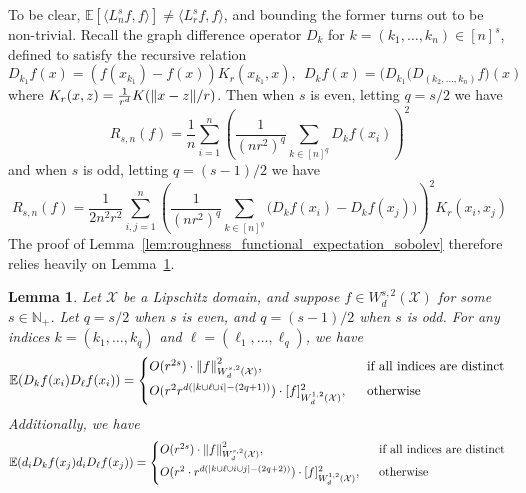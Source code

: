 \documentclass{article}
\newcommand{\1}{\mathbf{1}}
\newcommand{\Xset}{\mathcal{X}}
\newcommand{\Ebb}{\mathbb{E}}
\newcommand{\dotp}[2]{\langle #1, #2 \rangle}
\theoremstyle{alden}
\theoremstyle{aldenthm}
\newtheorem{lemma}{Lemma}
\theoremstyle{definition}
\theoremstyle{remark}
\begin{document}
To be clear, $\Ebb[\dotp{L_n^sf}{f}] \neq \dotp{L_r^sf}{f}$, and bounding the former turns out to be non-trivial. Recall the graph difference operator $D_k$ for $k = (k_1,\ldots,k_n) \in [n]^s$, defined to satisfy the recursive relation
\begin{equation*}
D_{k_1}f(x) = (f(x_{k_1}) - f(x))K_r(x_{k_1},x),~~ D_kf(x) = \bigl(D_{k_1}(D_{(k_2,\ldots,k_n)}f\bigr)(x)
\end{equation*}
where $K_r(x,z) = \frac{1}{r^d}K(\norm{x - z}/r)$. 
Then when $s$ is even, letting $q = s/2$ we have
\begin{equation}
\label{eqn:roughness_functional_representation_even}
R_{s,n}(f) = \frac{1}{n}\sum_{i = 1}^{n} \left(\frac{1}{(nr^2)^q}\sum_{k \in [n]^q} D_kf(x_i)\right)^2
\end{equation}
and when $s$ is odd, letting $q = (s - 1)/2$ we have
\begin{equation}
\label{eqn:roughness_functional_representation_odd}
R_{s,n}(f) =  \frac{1}{2n^2r^2}\sum_{i,j = 1}^{n}\left(\frac{1}{(nr^2)^q}\sum_{k \in [n]^q}\bigl(D_kf(x_i) - D_kf(x_j)\bigr)\right)^2K_r(x_i,x_j)
\end{equation} The proof of Lemma~\ref{lem:roughness_functional_expectation_sobolev} therefore relies heavily on Lemma~\ref{lem:expected_difference_operators_sobolev}.

\begin{lemma}
	\label{lem:expected_difference_operators_sobolev}
	Let $\Xset$ be a Lipschitz domain, and suppose $f \in W_d^{s,2}(\Xset)$ for some $s \in \mathbb{N}_{+}$. Let $q = s/2$ when $s$ is even, and $q = (s - 1)/2$ when $s$ is odd. For any indices $k = (k_1,\ldots,k_q)$ and $\ell = (\ell_1,\ldots,\ell_q)$, we have
	\begin{equation}
	\label{eqn:expected_difference_operators_sobolev_1}
	\Ebb(D_kf(x_i) D_\ell f(x_i)) =
	\begin{cases*}
	O(r^{2s}) \cdot \norm{f}_{W_d^{s,2}(\Xset)}^2, & ~~\textrm{if all indices are distinct} \\
	O(r^{2} r^{d(\abs{k \cup \ell \cup i} - (2q + 1))})\cdot [f]_{W_d^{1,2}(\Xset)}^2, & ~~\textrm{otherwise}~ 
	\end{cases*}
	\end{equation}
	Additionally, we have
	\begin{equation}
	\label{eqn:expected_difference_operators_sobolev_2}
	\Ebb(d_iD_kf(x_j) d_iD_\ell f(x_j)) =
	\begin{cases*}
	O(r^{2s}) \cdot \norm{f}_{W_d^{s,2}(\Xset)}^2, & ~~\textrm{if all indices are distinct} \\
	O(r^{2} \cdot r^{d(\abs{k \cup \ell \cup i \cup j} - (2q + 2))}) \cdot [f]_{W_d^{1,2}(\Xset)}^2, & ~~\textrm{otherwise}~ 
	\end{cases*}
	\end{equation}
\end{lemma}
\end{document}
